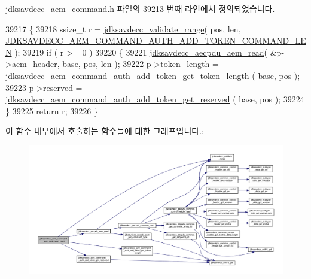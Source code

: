 jdksavdecc\+\_\+aem\+\_\+command.\+h 파일의 39213 번째 라인에서 정의되었습니다.


\begin{DoxyCode}
39217 \{
39218     ssize\_t r = \hyperlink{group__util_ga9c02bdfe76c69163647c3196db7a73a1}{jdksavdecc\_validate\_range}( pos, len, 
      \hyperlink{group__command__auth__add__token_gad1298ed4a1b7f5d8f13b7a16a0ddbd83}{JDKSAVDECC\_AEM\_COMMAND\_AUTH\_ADD\_TOKEN\_COMMAND\_LEN} );
39219     \textcolor{keywordflow}{if} ( r >= 0 )
39220     \{
39221         \hyperlink{group__aecpdu__aem_gae2421015dcdce745b4f03832e12b4fb6}{jdksavdecc\_aecpdu\_aem\_read}( &p->\hyperlink{structjdksavdecc__aem__command__auth__add__token_ae1e77ccb75ff5021ad923221eab38294}{aem\_header}, base, pos, len );
39222         p->\hyperlink{structjdksavdecc__aem__command__auth__add__token_a97da4c134a2723b8dbcd1c88d8577991}{token\_length} = 
      \hyperlink{group__command__auth__add__token_ga0b29b7219d1586729f6dffec07fea614}{jdksavdecc\_aem\_command\_auth\_add\_token\_get\_token\_length}
      ( base, pos );
39223         p->\hyperlink{structjdksavdecc__aem__command__auth__add__token_a5a6ed8c04a3db86066924b1a1bf4dad3}{reserved} = \hyperlink{group__command__auth__add__token_gabe74700fee16d590ad3273e5f566c1ee}{jdksavdecc\_aem\_command\_auth\_add\_token\_get\_reserved}
      ( base, pos );
39224     \}
39225     \textcolor{keywordflow}{return} r;
39226 \}
\end{DoxyCode}


이 함수 내부에서 호출하는 함수들에 대한 그래프입니다.\+:
\nopagebreak
\begin{figure}[H]
\begin{center}
\leavevmode
\includegraphics[width=350pt]{group__command__auth__add__token_gaa1db6b8fca96031bb6fb3db33fb2f066_cgraph}
\end{center}
\end{figure}


